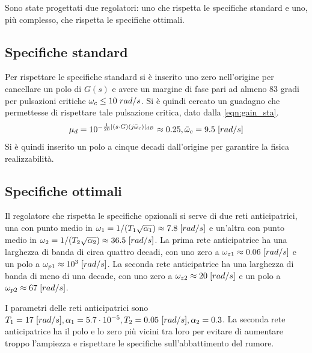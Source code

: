 \documentclass[a4paper]{article}
\begin{document}
Sono state progettati due regolatori: uno che rispetta le specifiche standard e uno, più complesso, che rispetta le specifiche ottimali.

\subsection{Specifiche standard}
Per rispettare le specifiche standard si è inserito uno zero nell'origine per cancellare un polo di $G(s)$ e avere un margine di fase pari ad almeno 83 gradi per pulsazioni critiche $\omega_c \le 10\hspace{0.3em} rad/s$.
Si è quindi cercato un guadagno che permettesse di rispettare tale pulsazione critica, dato dalla \cref{eqn:gain_sta}.
\begin{equation}
\mu_d =  10^{-\frac{1}{20}|(s \cdot G)(j \bar{\omega}_c)|_{dB}} \approx 0.25, \bar{\omega}_c = 9.5 \hspace{0.3em} [rad/s]
\label{eqn:gain_sta}
\end{equation}
Si è quindi inserito un polo a cinque decadi dall'origine per garantire la fisica realizzabilità.

\subsection{Specifiche ottimali}
Il regolatore che rispetta le specifiche opzionali si serve di due reti anticipatrici, una con punto medio in $\omega_1 = 1/ (T_1 \sqrt{\alpha_1}) \approx 7.8\hspace{0.3em} [rad/s]$ e un'altra con punto medio in $\omega_2 = 1/ (T_2 \sqrt{\alpha_2}) \approx 36.5 \hspace{0.3em} [rad/s]$.
La prima rete anticipatrice ha una larghezza di banda di circa quattro decadi, con uno zero a $\omega_{z1} \approx 0.06 \hspace{0.3em} [rad/s]$ e un polo a $\omega_{p1} \approx 10^3 \hspace{0.3em} [rad/s]$.
La seconda rete anticipatrice ha una larghezza di banda di meno di una decade, con uno zero a $\omega_{z2} \approx 20\hspace{0.3em} [rad/s]$ e un polo a $\omega_{p2} \approx 67\hspace{0.3em} [rad/s]$.

I parametri delle reti anticipatrici sono $T_1 = 17\hspace{0.3em} [rad/s], \alpha_1 = 5.7 \cdot 10^{-5}, T_2 = 0.05\hspace{0.3em} [rad/s], \alpha_2 = 0.3$.
La seconda rete anticipatrice ha il polo e lo zero più vicini tra loro per evitare di aumentare troppo l'ampiezza e rispettare le specifiche sull'abbattimento del rumore.
\end{document}
